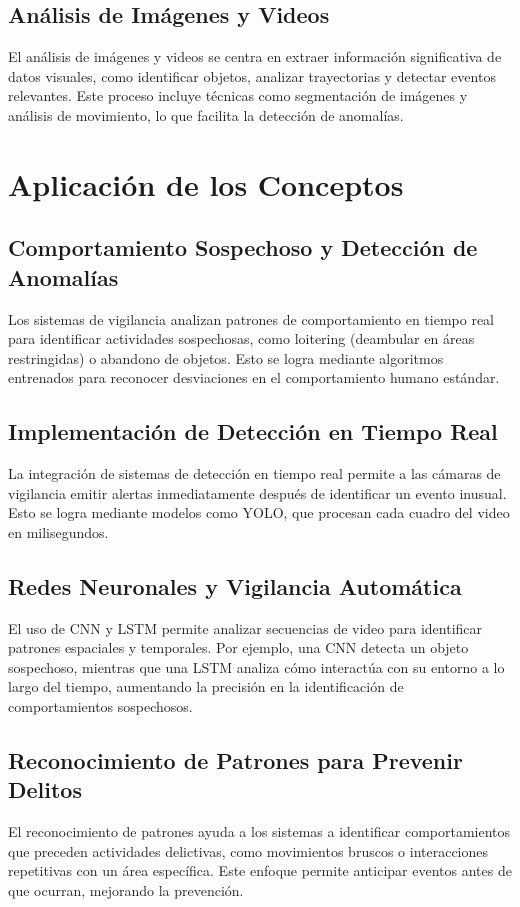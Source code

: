 \subsection{Análisis de Imágenes y Videos}
El análisis de imágenes y videos se centra en extraer información significativa de datos visuales, como identificar objetos, analizar trayectorias y detectar eventos relevantes. Este proceso incluye técnicas como segmentación de imágenes y análisis de movimiento, lo que facilita la detección de anomalías.

\section{Aplicación de los Conceptos}

\subsection{Comportamiento Sospechoso y Detección de Anomalías}
Los sistemas de vigilancia analizan patrones de comportamiento en tiempo real para identificar actividades sospechosas, como loitering (deambular en áreas restringidas) o abandono de objetos. Esto se logra mediante algoritmos entrenados para reconocer desviaciones en el comportamiento humano estándar.

\subsection{Implementación de Detección en Tiempo Real}
La integración de sistemas de detección en tiempo real permite a las cámaras de vigilancia emitir alertas inmediatamente después de identificar un evento inusual. Esto se logra mediante modelos como YOLO, que procesan cada cuadro del video en milisegundos.

\subsection{Redes Neuronales y Vigilancia Automática}
El uso de CNN y LSTM permite analizar secuencias de video para identificar patrones espaciales y temporales. Por ejemplo, una CNN detecta un objeto sospechoso, mientras que una LSTM analiza cómo interactúa con su entorno a lo largo del tiempo, aumentando la precisión en la identificación de comportamientos sospechosos.

\subsection{Reconocimiento de Patrones para Prevenir Delitos}
El reconocimiento de patrones ayuda a los sistemas a identificar comportamientos que preceden actividades delictivas, como movimientos bruscos o interacciones repetitivas con un área específica. Este enfoque permite anticipar eventos antes de que ocurran, mejorando la prevención.

